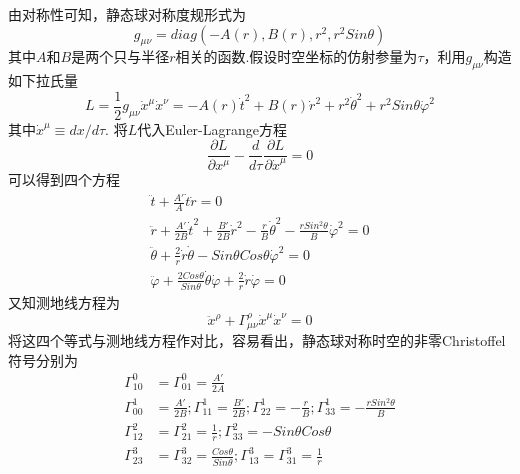	
	
	由对称性可知，静态球对称度规形式为
	\begin{equation}
		  g_{\mu\nu}=diag\left(-A(r),B(r),r^2,r^2Sin\theta\right)
	\end{equation}
	其中$A$和$B$是两个只与半径$r$相关的函数.假设时空坐标的仿射参量为$\tau$，利用$g_{\mu\nu}$构造如下拉氏量
	\begin{equation}
		  L=\frac{1}{2}g_{\mu\nu}\dot{x}^\mu\dot{x}^\nu=-A(r)\dot{t}^2+B(r)\dot{r}^2+r^2\dot{\theta}^2+r^2Sin\theta\dot{\varphi}^2
	\end{equation}
	其中$\dot{x}^\mu\equiv dx/d\tau$.
	将$L$代入Euler-Lagrange方程
	\begin{equation}
		  \frac{\partial L}{\partial x^\mu}-\frac{d}{d\tau}\frac{\partial L}{\partial \dot{x}^\mu}=0
	\end{equation}
	可以得到四个方程
	\begin{eqnarray*}
		  \ddot{t}+\frac{A'}{A}\dot{t}\dot{r}=0\\
		  \ddot{r}+\frac{A'}{2B}\dot{t}^2+\frac{B'}{2B}\dot{r}^2-\frac{r}{B}\dot{\theta}^2-\frac{rSin^2\theta}{B}\dot{\varphi}^2=0\\
		  \ddot{\theta}+\frac{2}{r}\dot{r}\dot{\theta}-Sin\theta Cos\theta\dot{\varphi}^2=0\\
		  \ddot{\varphi}+\frac{2Cos\theta}{Sin\theta}\dot{\theta}\dot{\varphi}+\frac{2}{r}\dot{r}\dot{\varphi}=0
	\end{eqnarray*}
	又知测地线方程为
	\begin{equation}
		  \ddot{x}^\rho+\Gamma^\rho_{\mu\nu}\dot{x}^\mu\dot{x}^\nu=0
	\end{equation}
	将这四个等式与测地线方程作对比，容易看出，静态球对称时空的非零Christoffel符号分别为
	\begin{equation}
		  \begin{split}
				\Gamma^0_{10}&=\Gamma^0_{01}=\frac{A'}{2A}\\
				\Gamma^1_{00}&=\frac{A'}{2B};\Gamma^1_{11}=\frac{B'}{2B};\Gamma^1_{22}=-\frac{r}{B};\Gamma^1_{33}=-\frac{rSin^2\theta}{B}\\
				\Gamma^2_{12}&=\Gamma^2_{21}=\frac{1}{r};\Gamma^2_{33}=-Sin\theta Cos\theta\\
				\Gamma^3_{23}&=\Gamma^3_{32}=\frac{Cos\theta}{Sin\theta};\Gamma^3_{13}=\Gamma^3_{31}=\frac{1}{r}
		  \end{split}
	\end{equation}
	
